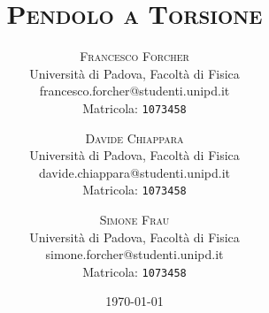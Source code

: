 \title {\vspace{-2cm} \fontsize{60pt}{10pt}\selectfont\textsc{Pendolo a Torsione}}
\author{
\large
\textsc{Francesco Forcher}\\[2mm]
\normalsize Università di Padova, Facoltà di Fisica\\
\normalsize francesco.forcher@studenti.unipd.it\\
\normalsize Matricola: \texttt{1073458}\\
\and
\large
\textsc{Davide Chiappara}\\[2mm]
\normalsize Università di Padova, Facoltà di Fisica\\
\normalsize davide.chiappara@studenti.unipd.it\\
\normalsize Matricola: \texttt{1073458}\\
\and
\large
\textsc{Simone Frau}\\[2mm]
\normalsize Università di Padova, Facoltà di Fisica\\
\normalsize simone.forcher@studenti.unipd.it\\
\normalsize Matricola: \texttt{1073458}
}
\date{\today}
